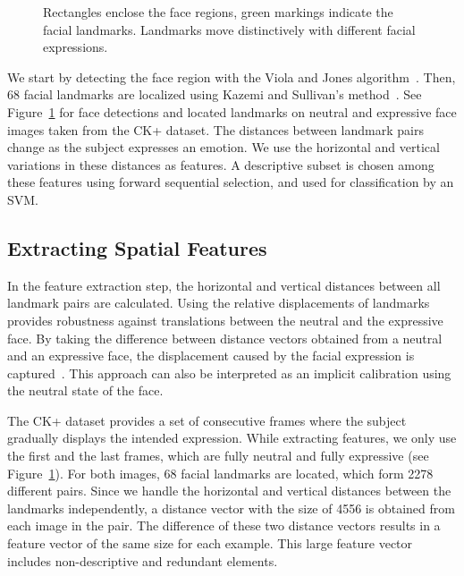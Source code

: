 \documentclass[hyperfootnotes=false]{article}
\begin{document}
\begin{figure}
	
	\caption{Rectangles enclose the face regions, green markings indicate the facial landmarks.
		Landmarks move distinctively with different facial expressions.}
	\label{fig:Cohn-Kanade}
\end{figure}

We start by detecting the face region with the Viola and Jones algorithm~\cite{Viola:2004}.
Then, 68 facial landmarks are localized using Kazemi and Sullivan's method~\cite{Kazemi:2014}.
See Figure~\ref{fig:Cohn-Kanade} for face detections and located landmarks on neutral and expressive face images taken from the CK+ dataset.
The distances between landmark pairs change as the subject expresses an emotion.
We use the horizontal and vertical variations in these distances as features.
A descriptive subset is chosen among these features using forward sequential selection, and used for classification by an SVM.

\subsection{Extracting Spatial Features}
\label{sec:features}

In the feature extraction step, the horizontal and vertical distances between all landmark pairs are calculated.
Using the relative displacements of landmarks provides robustness against translations between the neutral and the expressive face.
By taking the difference between distance vectors obtained from a neutral and an expressive face, the displacement caused by the facial expression is captured~\cite{Lucey:2010}.
This approach can also be interpreted as an implicit calibration using the neutral state of the face.

The CK+ dataset provides a set of consecutive frames where the subject gradually displays the intended expression.
While extracting features, we only use the first and the last frames, which are fully neutral and fully expressive (see Figure~\ref{fig:Cohn-Kanade}).
For both images, 68 facial landmarks are located, which form 2278 different pairs.
Since we handle the horizontal and vertical distances between the landmarks independently, a distance vector with the size of 4556 is obtained from each image in the pair.
The difference of these two distance vectors results in a feature vector of the same size for each example.
This large feature vector includes non-descriptive and redundant elements.
\end{document}
